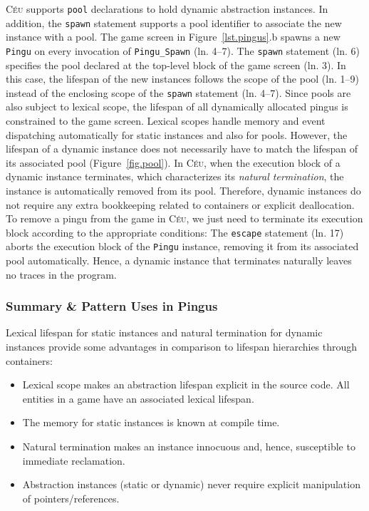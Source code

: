 \documentclass{vgtc}                          %
\newcommand{\CEU}{\textsc{C\'{e}u}\xspace}
\newcommand{\code}[1] {{\small{\texttt{#1}}}}
\begin{document}
\CEU supports \code{pool} declarations to hold dynamic abstraction instances.
In addition, the \code{spawn} statement supports a pool identifier to associate
the new instance with a pool.
%
The game screen in Figure~\ref{lst.pingus}.b spawns a new \code{Pingu} on every
invocation of \code{Pingu\_Spawn} (ln. 4--7).
%
The \code{spawn} statement (ln. 6) specifies the pool declared at the top-level
block of the game screen (ln. 3).
In this case, the lifespan of the new instances follows the scope of the pool
(ln. 1--9) instead of the enclosing scope of the \code{spawn} statement
(ln. 4--7).
Since pools are also subject to lexical scope, the lifespan of all dynamically
allocated pingus is constrained to the game screen.
%
Lexical scopes handle memory and event dispatching automatically for static
instances and also for pools.
However, the lifespan of a dynamic instance does not necessarily have to match
the lifespan of its associated pool (Figure~\ref{fig.pool}).
In \CEU, when the execution block of a dynamic instance terminates, which
characterizes its \emph{natural termination}, the instance is automatically
removed from its pool.
Therefore, dynamic instances do not require any extra bookkeeping related to 
containers or explicit deallocation.
%
To remove a pingu from the game in \CEU, we just need to terminate its execution
block according to the appropriate conditions:
%
The \code{escape} statement (ln. 17) aborts the execution block of the
\code{Pingu} instance, removing it from its associated pool automatically.
Hence, a dynamic instance that terminates naturally leaves no traces in the 
program.

\subsubsection{Summary \& Pattern Uses in Pingus}

Lexical lifespan for static instances and natural termination for dynamic
instances provide some advantages in comparison to lifespan hierarchies through
containers:

\begin{itemize}
\item Lexical scope makes an abstraction lifespan explicit in the source code.
      All entities in a game have an associated lexical lifespan.
\item The memory for static instances is known at compile time.
\item Natural termination makes an instance innocuous and, hence, susceptible
      to immediate reclamation.
\item Abstraction instances (static or dynamic) never require explicit
      manipulation of pointers/references.
\end{itemize}
\end{document}
